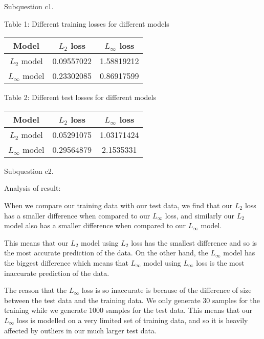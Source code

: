 \documentclass[12pt]{article}
\newcounter{ques}
\newenvironment{question}{\stepcounter{ques}{\noindent\bf Question \arabic{ques}:}}{\vspace{5mm}}
\begin{document}
\begin{question}
\quad

Subquestion c1.

\begin{center}
Table 1: Different training losses for different models
\end{center}
\begin{table}[h]
\centering
\begin{tabular}{c|cc}
    \textbf{Model} & $L_2$ loss & $L_\infty$ loss \\
    \hline
    $L_2$ model   &      0.09557022      &         1.58819212        \\
    $L_\infty$ model &      0.23302085      &           0.86917599      
\end{tabular}
\end{table}

\begin{center}
Table 2: Different test losses for different models
\end{center}
\begin{table}[h]
\centering
\begin{tabular}{c|cc}
    \textbf{Model} & $L_2$ loss & $L_\infty$ loss \\
    \hline
    $L_2$ model   &      0.05291075      &        1.03171424         \\
    $L_\infty$ model &      0.29564879      &         2.1535331        
\end{tabular}
\end{table}

\quad

Subquestion c2.

Analysis of result:

When we compare our training data with our test data, we find that our $L_2$ loss has a smaller difference when compared to our $L_{\infty}$ loss, and similarly our $L_2$ model also has a smaller difference when compared to our $L_{\infty}$ model.

This means that our $L_2$ model using $L_2$ loss has the smallest difference and so is the most accurate prediction of the data. On the other hand, the $L_{\infty}$ model has the biggest difference which means that $L_{\infty}$ model using $L_{\infty}$ loss is the most inaccurate prediction of the data.

The reason that the $L_{\infty}$ loss is so inaccurate is because of the difference of size between the test data and the training data. We only generate 30 samples for the training while we generate 1000 samples for the test data. This means that our $L_{\infty}$ loss is modelled on a very limited set of training data, and so it is heavily affected by outliers in our much larger test data.


\end{question}
\end{document}
